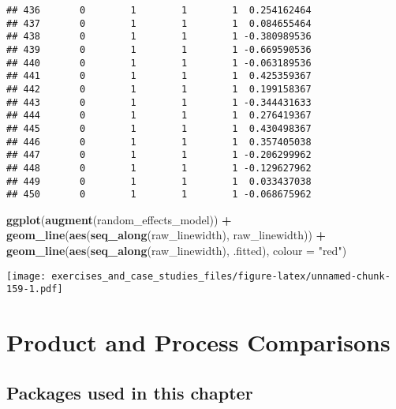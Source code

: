 \documentclass[]{book}
\newenvironment{Shaded}{\begin{snugshade}}{\end{snugshade}}
\newcommand{\CommentTok}[1]{\textcolor[rgb]{0.56,0.35,0.01}{\textit{#1}}}
\newcommand{\DataTypeTok}[1]{\textcolor[rgb]{0.13,0.29,0.53}{#1}}
\newcommand{\KeywordTok}[1]{\textcolor[rgb]{0.13,0.29,0.53}{\textbf{#1}}}
\newcommand{\NormalTok}[1]{#1}
\newcommand{\OperatorTok}[1]{\textcolor[rgb]{0.81,0.36,0.00}{\textbf{#1}}}
\newcommand{\StringTok}[1]{\textcolor[rgb]{0.31,0.60,0.02}{#1}}
\theoremstyle{definition}
\theoremstyle{definition}
\theoremstyle{definition}
\theoremstyle{remark}
\begin{document}
\begin{verbatim}
## 436       0        1        1        1  0.254162464
## 437       0        1        1        1  0.084655464
## 438       0        1        1        1 -0.380989536
## 439       0        1        1        1 -0.669590536
## 440       0        1        1        1 -0.063189536
## 441       0        1        1        1  0.425359367
## 442       0        1        1        1  0.199158367
## 443       0        1        1        1 -0.344431633
## 444       0        1        1        1  0.276419367
## 445       0        1        1        1  0.430498367
## 446       0        1        1        1  0.357405038
## 447       0        1        1        1 -0.206299962
## 448       0        1        1        1 -0.129627962
## 449       0        1        1        1  0.033437038
## 450       0        1        1        1 -0.068675962
\end{verbatim}

\begin{Shaded}
\begin{Highlighting}[]
\KeywordTok{ggplot}\NormalTok{(}\KeywordTok{augment}\NormalTok{(random_effects_model)) }\OperatorTok{+}
\StringTok{  }\KeywordTok{geom_line}\NormalTok{(}\KeywordTok{aes}\NormalTok{(}\KeywordTok{seq_along}\NormalTok{(raw_linewidth), raw_linewidth)) }\OperatorTok{+}
\StringTok{  }\KeywordTok{geom_line}\NormalTok{(}\KeywordTok{aes}\NormalTok{(}\KeywordTok{seq_along}\NormalTok{(raw_linewidth), .fitted), }\DataTypeTok{colour =} \StringTok{"red"}\NormalTok{)}
\end{Highlighting}
\end{Shaded}

\texttt{[image: exercises\_and\_case\_studies\_files/figure-latex/unnamed-chunk-159-1.pdf]}

\hypertarget{product-and-process-comparisons}{%
\chapter{Product and Process
Comparisons}\label{product-and-process-comparisons}}

\hypertarget{packages-used-in-this-chapter-4}{%
\section{Packages used in this
chapter}\label{packages-used-in-this-chapter-4}}

\begin{Shaded}
\end{Shaded}
\end{document}
